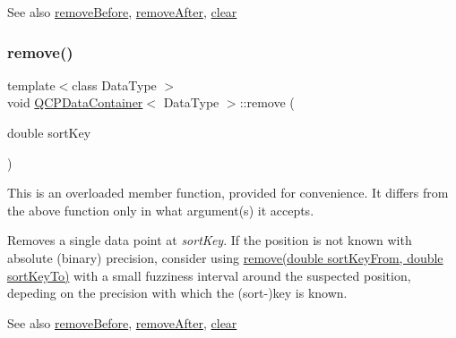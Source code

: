 \begin{DoxySeeAlso}{See also}
\hyperlink{class_q_c_p_data_container_aa7f74cbce304b0369e1626c3798e1eda}{remove\+Before}, \hyperlink{class_q_c_p_data_container_abbe5d87ffc10b5aeffa5bb42cf03aa3c}{remove\+After}, \hyperlink{class_q_c_p_data_container_a7e2b29736c6fd761649bda1a54ba967f}{clear} 
\end{DoxySeeAlso}
\mbox{\label{class_q_c_p_data_container_a2dbded7f0732bacf9db48fdfbbb620bc}} 
\subsubsection{\texorpdfstring{remove()}{remove()}\hspace{0.1cm}{\footnotesize\ttfamily [2/2]}}
{\footnotesize\ttfamily template$<$class Data\+Type $>$ \\
void \hyperlink{class_q_c_p_data_container}{Q\+C\+P\+Data\+Container}$<$ Data\+Type $>$\+::remove (\begin{DoxyParamCaption}\item[{double}]{sort\+Key }\end{DoxyParamCaption})}

This is an overloaded member function, provided for convenience. It differs from the above function only in what argument(s) it accepts.

Removes a single data point at {\itshape sort\+Key}. If the position is not known with absolute (binary) precision, consider using \hyperlink{class_q_c_p_data_container_ae5f569a120648b167efa78835f12fd38}{remove(double sort\+Key\+From, double sort\+Key\+To)} with a small fuzziness interval around the suspected position, depeding on the precision with which the (sort-\/)key is known.

\begin{DoxySeeAlso}{See also}
\hyperlink{class_q_c_p_data_container_aa7f74cbce304b0369e1626c3798e1eda}{remove\+Before}, \hyperlink{class_q_c_p_data_container_abbe5d87ffc10b5aeffa5bb42cf03aa3c}{remove\+After}, \hyperlink{class_q_c_p_data_container_a7e2b29736c6fd761649bda1a54ba967f}{clear} 
\end{DoxySeeAlso}
\mbox{\label{class_q_c_p_data_container_abbe5d87ffc10b5aeffa5bb42cf03aa3c}} 
